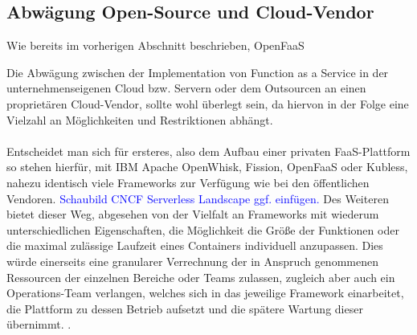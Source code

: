 \documentclass[11pt]{article}
\begin{document}
\subsection{Abwägung Open-Source und Cloud-Vendor}
Wie bereits im vorherigen Abschnitt beschrieben, 
OpenFaaS  

Die Abwägung zwischen der Implementation von Function as a Service in der unternehmenseigenen Cloud bzw. Servern oder dem Outsourcen an einen proprietären Cloud-Vendor, sollte wohl überlegt sein, da hiervon in der Folge eine Vielzahl an Möglichkeiten und Restriktionen abhängt. \\\\
Entscheidet man sich für ersteres, also dem Aufbau einer privaten FaaS-Plattform so stehen hierfür, mit IBM Apache OpenWhisk, Fission, OpenFaaS oder Kubless, nahezu identisch viele Frameworks zur Verfügung wie bei den öffentlichen Vendoren. \textcolor{blue}{Schaubild CNCF Serverless Landscape ggf. einfügen.} Des Weiteren bietet dieser Weg, abgesehen von der Vielfalt an Frameworks mit wiederum unterschiedlichen Eigenschaften, die Möglichkeit die Größe der Funktionen oder die maximal zulässige Laufzeit eines Containers individuell anzupassen. Dies würde einerseits eine granularer Verrechnung der in Anspruch genommenen Ressourcen der einzelnen Bereiche oder Teams zulassen, zugleich aber auch ein Operations-Team verlangen, welches sich in das jeweilige Framework einarbeitet, die Plattform zu dessen Betrieb aufsetzt und die spätere Wartung dieser übernimmt. \cite{mohanty2018evaluation}.\\\\
\end{document}
